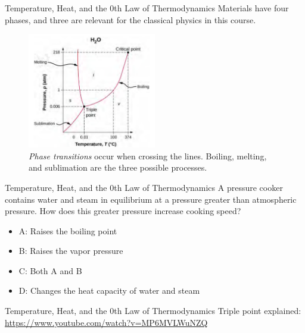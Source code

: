 \documentclass{beamer}
\begin{document}
\begin{frame}{Temperature, Heat, and the 0th Law of Thermodynamics}
Materials have four phases, and three are relevant for the classical physics in this course.
\begin{figure}
\centering
\includegraphics[width=0.5\textwidth]{figures/PT.png}
\caption{\label{fig:pt} \textit{Phase transitions} occur when crossing the lines.  Boiling, melting, and sublimation are the three possible processes.}
\end{figure}
\end{frame}

\begin{frame}{Temperature, Heat, and the 0th Law of Thermodynamics}
A pressure cooker contains water and steam in equilibrium at a pressure greater than atmospheric pressure.  How does this greater pressure increase cooking speed?
\begin{itemize}
\item A: Raises the boiling point
\item B: Raises the vapor pressure
\item C: Both A and B
\item D: Changes the heat capacity of water and steam
\end{itemize}
\end{frame}

\begin{frame}{Temperature, Heat, and the 0th Law of Thermodynamics}
Triple point explained: \\ \url{https://www.youtube.com/watch?v=MP6MVLWuNZQ}
\end{frame}
\end{document}
